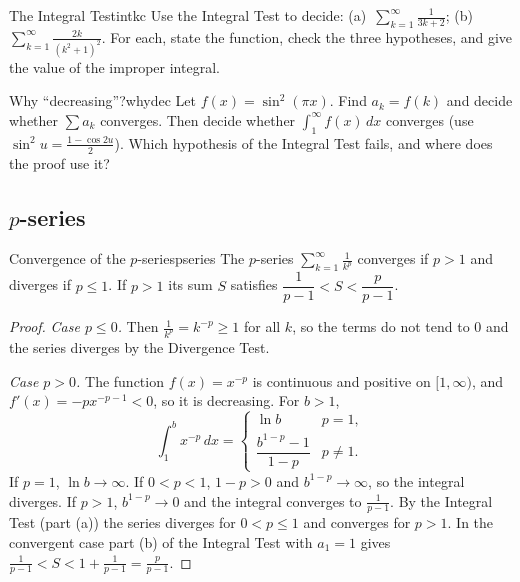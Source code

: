 \documentclass[11pt]{article}
\begin{document}
\begin{kc}{The Integral Test}{intkc}
Use the Integral Test to decide: (a)~$\displaystyle\sum_{k=1}^\infty\frac1{3k+2}$; \quad (b)~$\displaystyle\sum_{k=1}^\infty\frac{2k}{(k^2+1)^2}$. For each, state the function, check the three hypotheses, and give the value of the improper integral.
\end{kc}

\begin{think}{Why ``decreasing''?}{whydec}
Let $f(x)=\sin^2(\pi x)$. Find $a_k=f(k)$ and decide whether $\sum a_k$ converges. Then decide whether $\int_1^\infty f(x)\,dx$ converges (use $\sin^2u=\frac{1-\cos2u}2$). Which hypothesis of the Integral Test fails, and where does the proof use it?
\end{think}

\subsection*{$p$-series}

\begin{thm}{Convergence of the $p$-series}{pseries}
The $p$-series $\displaystyle\sum_{k=1}^\infty\frac1{k^p}$ converges if $p>1$ and diverges if $p\le1$. If $p>1$ its sum $S$ satisfies $\dfrac1{p-1}<S<\dfrac p{p-1}$.
\end{thm}
\begin{proof}
\emph{Case $p\le0$.} Then $\frac1{k^p}=k^{-p}\ge1$ for all $k$, so the terms do not tend to $0$ and the series diverges by the Divergence Test.

\emph{Case $p>0$.} The function $f(x)=x^{-p}$ is continuous and positive on $[1,\infty)$, and $f'(x)=-px^{-p-1}<0$, so it is decreasing. For $b>1$,
\[
\int_1^bx^{-p}\,dx=\begin{cases}\ln b & p=1,\\[2pt] \dfrac{b^{1-p}-1}{1-p} & p\ne1.\end{cases}
\]
If $p=1$, $\ln b\to\infty$. If $0<p<1$, $1-p>0$ and $b^{1-p}\to\infty$, so the integral diverges. If $p>1$, $b^{1-p}\to0$ and the integral converges to $\frac1{p-1}$. By the Integral Test (part (a)) the series diverges for $0<p\le1$ and converges for $p>1$. In the convergent case part (b) of the Integral Test with $a_1=1$ gives $\frac1{p-1}<S<1+\frac1{p-1}=\frac p{p-1}$.
\end{proof}
\end{document}
